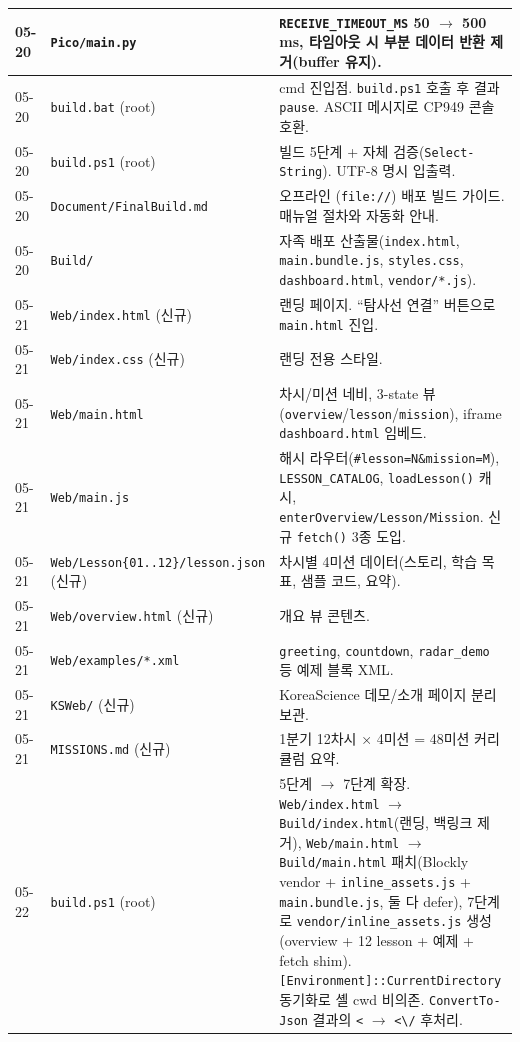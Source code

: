 \documentclass[11pt, oneside]{article}
\begin{document}
\begin{table}[h]
\begin{tabularx}{\linewidth}{@{}llX@{}}
05-20 & \texttt{Pico/main.py} & \texttt{RECEIVE\_TIMEOUT\_MS} 50 $\rightarrow$ 500\,ms, 타임아웃 시 부분 데이터 반환 제거(buffer 유지). \\
\midrule
05-20 & \texttt{build.bat} (root) & cmd 진입점. \texttt{build.ps1} 호출 후 결과 \texttt{pause}. ASCII 메시지로 CP949 콘솔 호환. \\
05-20 & \texttt{build.ps1} (root) & 빌드 5단계 + 자체 검증(\texttt{Select-String}). UTF-8 명시 입출력. \\
05-20 & \texttt{Document/FinalBuild.md} & 오프라인 (\texttt{file://}) 배포 빌드 가이드. 매뉴얼 절차와 자동화 안내. \\
05-20 & \texttt{Build/} & 자족 배포 산출물(\texttt{index.html}, \texttt{main.bundle.js}, \texttt{styles.css}, \texttt{dashboard.html}, \texttt{vendor/*.js}). \\
\midrule
05-21 & \texttt{Web/index.html} (신규) & 랜딩 페이지. ``탐사선 연결'' 버튼으로 \texttt{main.html} 진입. \\
05-21 & \texttt{Web/index.css} (신규) & 랜딩 전용 스타일. \\
05-21 & \texttt{Web/main.html} & 차시/미션 네비, 3-state 뷰(\texttt{overview}/\texttt{lesson}/\texttt{mission}), iframe \texttt{dashboard.html} 임베드. \\
05-21 & \texttt{Web/main.js} & 해시 라우터(\texttt{\#lesson=N\&mission=M}), \texttt{LESSON\_CATALOG}, \texttt{loadLesson()} 캐시, \texttt{enterOverview/Lesson/Mission}. 신규 \texttt{fetch()} 3종 도입. \\
05-21 & \texttt{Web/Lesson\{01..12\}/lesson.json} (신규) & 차시별 4미션 데이터(스토리, 학습 목표, 샘플 코드, 요약). \\
05-21 & \texttt{Web/overview.html} (신규) & 개요 뷰 콘텐츠. \\
05-21 & \texttt{Web/examples/*.xml} & \texttt{greeting}, \texttt{countdown}, \texttt{radar\_demo} 등 예제 블록 XML. \\
05-21 & \texttt{KSWeb/} (신규) & KoreaScience 데모/소개 페이지 분리 보관. \\
05-21 & \texttt{MISSIONS.md} (신규) & 1분기 12차시 × 4미션 = 48미션 커리큘럼 요약. \\
\midrule
05-22 & \texttt{build.ps1} (root) & 5단계 $\to$ 7단계 확장. \texttt{Web/index.html} $\to$ \texttt{Build/index.html}(랜딩, 백링크 제거), \texttt{Web/main.html} $\to$ \texttt{Build/main.html} 패치(Blockly vendor + \texttt{inline\_assets.js} + \texttt{main.bundle.js}, 둘 다 defer), 7단계로 \texttt{vendor/inline\_assets.js} 생성(overview + 12 lesson + 예제 + fetch shim). \texttt{[Environment]::CurrentDirectory} 동기화로 셸 cwd 비의존. \texttt{ConvertTo-Json} 결과의 \texttt{<\/} $\to$ \texttt{<\textbackslash{}/} 후처리. \\

\end{tabularx}
\end{table}
\end{document}
